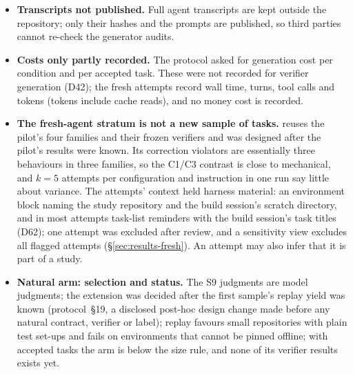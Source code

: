 \begin{itemize}
\begin{itemize}
\item The shared scratch directory held held-out material, and the first generator audit treated only its sealed parts as forbidden. A stricter re-audit, which resolves paths and covers the whole directory, found no read of candidate, verifier or sealed material, but some listings showed file names (\texttt{git status} among them, which named held-out \texttt{tinydb} candidate files), and one reviewer read an earlier reviewer's whole test runner there. The automatic checks of both audits read tool inputs only and do not resolve paths that inline code builds at run time; the re-audit's assessments rest on reading the transcripts only for the accesses it flags.
\item The hash of each verifier's scored check list was added after the first final run.
\end{itemize}
\item \textbf{Transcripts not published.} Full agent transcripts are kept outside the repository; only their hashes and the prompts are published, so third parties cannot re-check the generator audits.
\item \textbf{Costs only partly recorded.} The protocol asked for generation cost per condition and per accepted task. These were not recorded for verifier generation (D42); the fresh attempts record wall time, turns, tool calls and tokens (tokens include cache reads), and no money cost is recorded.
\item \textbf{The fresh-agent stratum is not a new sample of tasks.} \texttt{\FRESHRUN} reuses the pilot's four families and their frozen verifiers and was designed after the pilot's results were known. Its  correction violators are essentially three behaviours in three families, so the C1/C3 contrast is close to mechanical, and $k=5$ attempts per configuration and instruction in one run say little about variance. The attempts' context held harness material: an environment block naming the study repository and the build session's scratch directory, and in most attempts task-list reminders with the build session's task titles (D62); one attempt was excluded after review, and a sensitivity view excludes all  flagged attempts (\S\ref{sec:results-fresh}). An attempt may also infer that it is part of a study.
\item \textbf{Natural arm: selection and status.} The S9 judgments are model judgments; the extension was decided after the first sample's replay yield was known (protocol~\S19, a disclosed post-hoc design change made before any natural contract, verifier or label); replay favours small repositories with plain test set-ups and fails on environments that cannot be pinned offline; with  accepted tasks the arm is below the size rule, and none of its verifier results exists yet.

\end{itemize}
